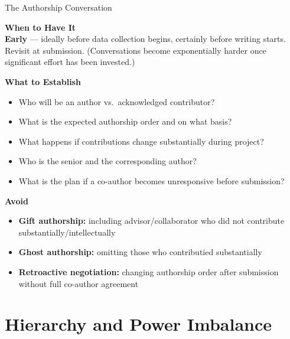 \documentclass{beamer}
\begin{document}
\begin{frame}{The Authorship Conversation}

  \footnotesize
  \textbf{When to Have It}\\
  \smallskip
  \textbf{Early} --- ideally before data collection begins,
  certainly before writing starts. Revisit at submission.
  (Conversations become exponentially harder once
  significant effort has been invested.)

  \medskip
  \textbf{What to Establish}
  \begin{itemize}
    \item Who will be an author vs.\ acknowledged contributor?
    \item What is the expected authorship order and on what basis?
    \item What happens if contributions change substantially
      during project?
    \item Who is the senior and the corresponding author?
    \item What is the plan if a co-author becomes unresponsive
      before submission?
  \end{itemize}

  \medskip
  \textbf{Avoid}
  \begin{itemize}
    \item \textbf{Gift authorship:} including advisor/collaborator who did not contribute substantially/intellectually
    \item \textbf{Ghost authorship:} omitting those who  contributied substantially
    \item \textbf{Retroactive negotiation:} changing authorship
      order after submission without full co-author agreement
  \end{itemize}

\end{frame}


\section{Hierarchy and Power Imbalance}
\end{document}
